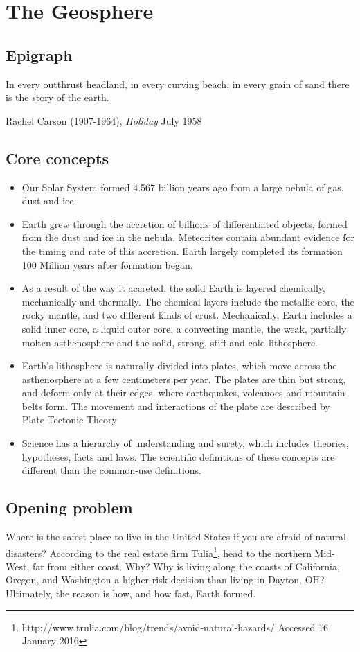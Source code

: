 \chapter{The Geosphere} \label{The Geosphere}
\section{Epigraph} \label{Geosphere:Epigraph}
\epigraph{In every outthrust headland, in every curving beach, in every grain of sand there is the story of the earth.}{Rachel Carson (1907-1964), \textit{Holiday} July 1958}

\section{Core concepts} \label{Core Concepts}
\begin{itemize}
\item Our Solar System formed 4.567 billion years ago from a large nebula of gas, dust and ice.
\item Earth grew through the accretion of billions of differentiated objects, formed from the dust and ice in the nebula. Meteorites contain abundant evidence for the timing and rate of this accretion. Earth largely completed its formation 100 Million years after formation began.
\item As a result of the way it accreted, the solid Earth is layered chemically, mechanically and thermally. The chemical layers include the metallic core, the rocky mantle, and two different kinds of crust. Mechanically, Earth includes a solid inner core, a liquid outer core, a convecting mantle, the weak, partially molten asthenosphere and the solid, strong, stiff and cold lithosphere.
\item Earth's lithosphere is naturally divided into plates, which move across the asthenosphere at a few centimeters per year. The plates are thin but strong, and deform only at their edges, where earthquakes, volcanoes and mountain belts form. The movement and interactions of the plate are described by Plate Tectonic Theory
\item Science has a hierarchy of understanding and surety, which includes theories, hypotheses, facts and laws. The scientific definitions of these concepts are different than the common-use definitions.
\end{itemize}

\section{Opening problem} \label{Opening Problem}
Where is the safest place to live in the United States if you are afraid of natural disasters? According to the real estate firm Tulia\footnote{http://www.trulia.com/blog/trends/avoid-natural-hazards/ Accessed 16 January 2016}, head to the northern Mid-West, far from either coast. Why? Why is living along the coasts of California, Oregon, and Washington a higher-risk decision than living in Dayton, OH? Ultimately, the reason is how, and how fast, Earth formed.


